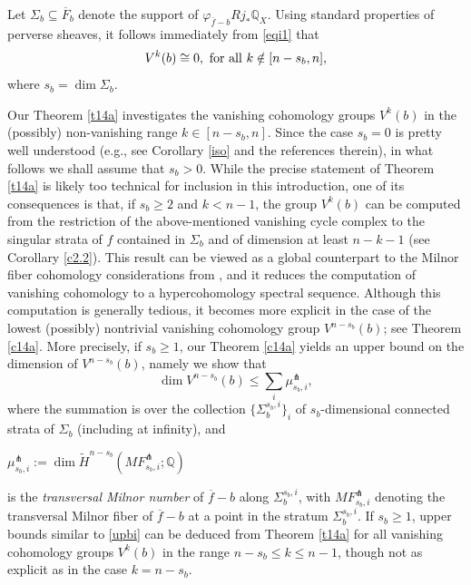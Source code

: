 \documentclass[12pt,leqno,twoside]{amsart}
\theoremstyle{remark}
\theoremstyle{remark}
\theoremstyle{definition}
\theoremstyle{remark}
\theoremstyle{remark}
\theoremstyle{remark}
\numberwithin{equation}{section}  %
\def\be{\begin{equation}}
\def\ee{\end{equation}}
\newcommand{\bQ}{\mathbb{Q}}
\newcommand{\of}{\overline{f}}
\newcommand{\oF}{\overline{F}}
\begin{document}
Let $\Sigma_b \subseteq \oF_b$ denote the support of $\varphi_{\overline{f}-b}Rj_*\bQ_X$. Using standard properties of perverse sheaves,  it follows immediately from \eqref{eqi1} that
\be\label{eqi2} V^k(b) \cong 0, \ {\rm for \ all} \ k \notin [n-s_b, n],   \ee
where $s_b=\dim \Sigma_b$.

Our Theorem \ref{t14a} investigates the vanishing cohomology groups $V^k(b)$ in the (possibly) non-vanishing range $k \in [n-s_b, n]$. Since the case $s_b=0$ is pretty well understood (e.g., see Corollary \ref{iso} and the references therein), in what follows we shall assume that $s_b>0$. While the precise statement of Theorem \ref{t14a} is likely too technical for inclusion in this introduction, one of its consequences is that, if $s_b \geq 2$ and $k<n-1$, the group $V^k(b)$ can be computed from the restriction of the above-mentioned vanishing cycle complex to the singular strata of $f$ contained in $\Sigma_b$ and  of dimension at least $n-k-1$ (see Corollary \ref{c2.2}). This result can be viewed as a global counterpart to the Milnor fiber cohomology considerations from  \cite{MPT2}, and it reduces the computation of vanishing cohomology to a hypercohomology spectral sequence. Although this computation is generally tedious, it becomes more explicit in the case of the lowest (possibly) nontrivial vanishing cohomology group $V^{n-s_b}(b)$; see  Theorem \ref{c14a}. More precisely, if $s_b \geq 1$, our Theorem \ref{c14a} yields an upper bound on the dimension of $V^{n-s_b}(b)$, namely we show that
\be\label{upbi}
\dim V^{n-s_b}(b) \leq  \sum_i  \mu^\pitchfork_{s_b,i},
 \ee
 where the summation is over the collection $\{\Sigma_b^{s_b,i}\}_i$ of $s_b$-dimensional connected strata of $\Sigma_b$ (including at infinity), and 
\begin{center} $\mu^\pitchfork_{s_b,i}:= \dim \widetilde{H}^{n-s_b}(MF^\pitchfork_{s_b,i};\bQ)$\end{center} is the {\it transversal Milnor number} of $\of-b$ along $\Sigma_b^{s_b,i}$,
with $MF^\pitchfork_{s_b,i}$ denoting the transversal Milnor fiber of $\of-b$ at a point in the stratum $\Sigma_b^{s_b,i}$.
If $s_b \geq 1$, upper bounds similar to \eqref{upbi} can be deduced from Theorem \ref{t14a} for all vanishing cohomology groups $V^k(b)$ in the range $n-s_b \leq k \leq n-1$, though not as explicit as in the case $k=n-s_b$.
\end{document}
